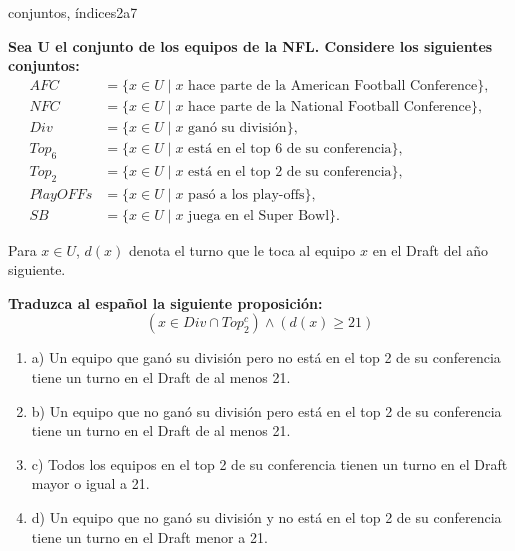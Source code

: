 \documentclass{article}
\begin{document}
\begin{question}{24}{conjuntos, índices}{2}{a}{7}{
\textbf{Sea U el conjunto de los equipos de la NFL. Considere los siguientes conjuntos:}
\[
\begin{aligned}
AFC &= \{ x \in U \mid x \text{ hace parte de la American Football Conference}\},\\
NFC &= \{ x \in U \mid x \text{ hace parte de la National Football Conference}\},\\
Div &= \{ x \in U \mid x \text{ ganó su división}\},\\
Top_6 &= \{ x \in U \mid x \text{ está en el top 6 de su conferencia}\},\\
Top_2 &= \{ x \in U \mid x \text{ está en el top 2 de su conferencia}\},\\
PlayOFFs &= \{ x \in U \mid x \text{ pasó a los play-offs}\},\\
SB &= \{ x \in U \mid x \text{ juega en el Super Bowl}\}.
\end{aligned}
\]

Para $x \in U$, $d(x)$ denota el turno que le toca al equipo $x$ en el Draft del año siguiente. \medskip

\textbf{Traduzca al español la siguiente proposición:}
\[
(x \in Div \cap Top_2^c)\land(d(x) \geq 21)
\]

\begin{enumerate}
    \item a) Un equipo que ganó su división pero no está en el top 2 de su conferencia tiene un turno en el Draft de al menos 21.  
    \item b) Un equipo que no ganó su división pero está en el top 2 de su conferencia tiene un turno en el Draft de al menos 21.  
    \item c) Todos los equipos en el top 2 de su conferencia tienen un turno en el Draft mayor o igual a 21.  
    \item d) Un equipo que no ganó su división y no está en el top 2 de su conferencia tiene un turno en el Draft menor a 21.  
\end{enumerate}
}
\end{question}
\end{document}
